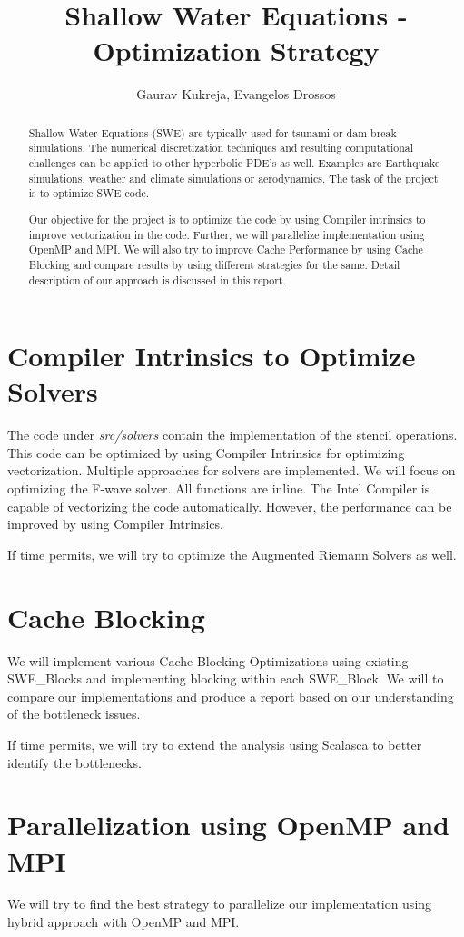 \documentclass[]{article}
\title{Shallow Water Equations - Optimization Strategy}
\author{Gaurav Kukreja, Evangelos Drossos}
\begin{document}
\maketitle

\begin{abstract}
Shallow Water Equations (SWE) are typically used for tsunami or dam-break simulations.
The numerical discretization techniques and resulting computational challenges can be
applied to other hyperbolic PDE's as well. Examples are Earthquake simulations,
weather and climate simulations or aerodynamics. The task of the project is to optimize
SWE code. 

Our objective for the project is to optimize the code by using Compiler intrinsics to
improve vectorization in the code. Further, we will parallelize implementation using
OpenMP and MPI. We will also try to improve Cache Performance by using Cache Blocking
and compare results by using different strategies for the same. Detail description of
our approach is discussed in this report.
\end{abstract}

\section{Compiler Intrinsics to Optimize Solvers}
The code under \textit{src/solvers} contain the implementation of the stencil operations.
This code can be optimized by using Compiler Intrinsics for optimizing vectorization.
Multiple approaches for solvers are implemented. We will focus on optimizing the 
F-wave solver. All functions are inline. The Intel Compiler is capable of vectorizing
the code automatically. However, the performance can be improved by using Compiler
Intrinsics.

If time permits, we will try to optimize the Augmented Riemann Solvers as well.

\section{Cache Blocking}
We will implement various Cache Blocking Optimizations using existing SWE\_Blocks and
implementing blocking within each SWE\_Block. We will to compare our implementations and
produce a report based on our understanding of the bottleneck issues.

If time permits, we will try to extend the analysis using Scalasca to better identify
the bottlenecks.

\section{Parallelization using OpenMP and MPI}
We will try to find the best strategy to parallelize our implementation using hybrid
approach with OpenMP and MPI. 
\end{document}
